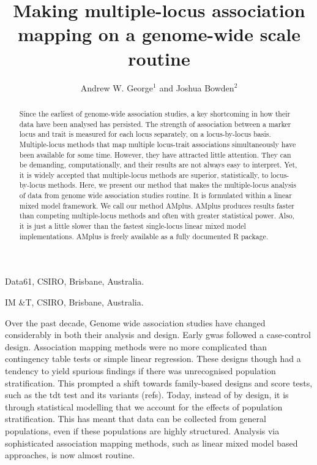\documentclass{nature}
\begin{document}
\title{Making multiple-locus association mapping on a genome-wide scale routine}
\author{Andrew W. George$^1$ and Joshua Bowden$^2$}

\maketitle

\begin{affiliations}
\item Data61, CSIRO, Brisbane, Australia.
\item IM \&T, CSIRO, Brisbane, Australia.
\end{affiliations}

\begin{abstract}
Since the earliest of genome-wide association studies, a key shortcoming in how their data have been analysed has persisted. The strength of association between a marker locus and trait is measured for each locus separately, on a locus-by-locus basis. Multiple-locus methods that map multiple locus-trait associations simultaneously have been available for some time. However, they have attracted little attention. They can be demanding, computationally, and their results are not always easy to interpret. Yet, it is widely accepted that multiple-locus methods are superior, statistically, to locus-by-locus methods. Here, we present our method that makes the multiple-locus analysis of data from genome wide association studies routine. It is formulated within a linear mixed model framework. 
We call our method AMplus.  AMplus produces results faster than competing multiple-locus methods and often with greater statistical power. Also, it is just a little slower than the fastest single-locus linear mixed model implementations. 
AMplus is freely available as a fully documented R package. 
\end{abstract}





Over the past decade,  Genome wide association studies have changed considerably in both their analysis and design. Early gwas followed a case-control design. Association mapping methods were no more complicated than contingency table tests or simple 
linear regression. These designs though had a tendency to yield spurious findings if there was unrecognised population stratification. This prompted a shift towards family-based designs and score tests, such as the tdt test and its variants (refs). Today, instead of by design, it is through statistical modelling that we account for the effects of population stratification. This has meant that data can be collected from general populations, even if these populations are highly structured. Analysis via sophisticated association mapping methods, such as linear mixed model based approaches,  is now almost routine.
\end{document}

